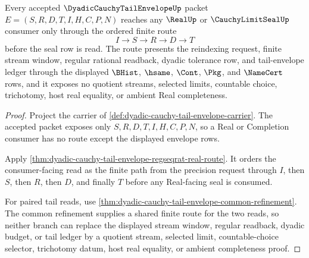 \begin{theorem}
\label{thm:dyadic-cauchy-tail-regular-seal}
Every accepted $\DyadicCauchyTailEnvelopeUp$ packet $E=(S,R,D,T,I,H,C,P,N)$ reaches any $\RealUp$ or $\CauchyLimitSealUp$ consumer only through the ordered finite route
$$
I \longrightarrow S \longrightarrow R \longrightarrow D \longrightarrow T
$$
before the seal row is read. The route presents the reindexing request, finite stream window, regular rational readback, dyadic tolerance row, and tail-envelope ledger through the displayed $\BHist$, $\hsame$, $\Cont$, $\Pkg$, and $\NameCert$ rows, and it exposes no quotient streams, selected limits, countable choice, trichotomy, host real equality, or ambient Real completeness.
\end{theorem}
\begin{proof}
Project the carrier of \autoref{def:dyadic-cauchy-tail-envelope-carrier}. The accepted packet exposes only $S,R,D,T,I,H,C,P,N$, so a Real or Completion consumer has no route except the displayed envelope rows.

Apply \autoref{thm:dyadic-cauchy-tail-envelope-regseqrat-real-route}. It orders the consumer-facing read as the finite path from the precision request through $I$, then $S$, then $R$, then $D$, and finally $T$ before any Real-facing seal is consumed.

For paired tail reads, use \autoref{thm:dyadic-cauchy-tail-envelope-common-refinement}. The common refinement supplies a shared finite route for the two reads, so neither branch can replace the displayed stream window, regular readback, dyadic budget, or tail ledger by a quotient stream, selected limit, countable-choice selector, trichotomy datum, host real equality, or ambient completeness proof.
\end{proof}

